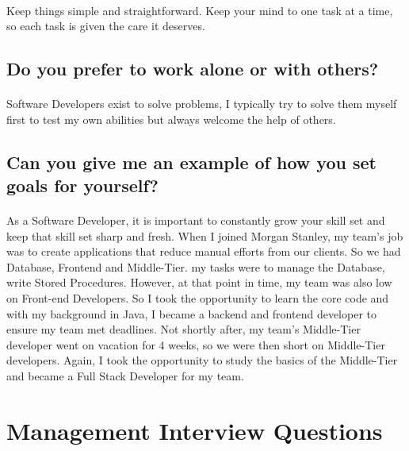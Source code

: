 \documentclass{article}
\begin{document}
\paragraph{}

	Keep things simple and straightforward. Keep your mind to one task at a time, so each task is given the care it deserves. 


\subsection{Do you prefer to work alone or with others?}

\paragraph{}

Software Developers exist to solve problems, I typically try to solve them myself first to test my own abilities but always welcome the help of others.  

\subsection{Can you give me an example of how you set goals for yourself?}

\paragraph{}

	As a Software Developer, it is important to constantly grow your skill set and keep that skill set sharp and fresh. When I joined Morgan Stanley, my team's job was to create applications that reduce manual efforts from our clients. So we had Database, Frontend and Middle-Tier. my tasks were to manage the Database, write Stored Procedures. However, at that point in time, my team was also low on Front-end Developers. So I took the opportunity to learn the core code and with my background in Java, I became a backend and frontend developer to ensure my team met deadlines. Not shortly after, my team's Middle-Tier developer went on vacation for 4 weeks, so we were then short on Middle-Tier developers. Again, I took the opportunity to study the basics of the Middle-Tier and became a Full Stack Developer for my team. 

\section{Management Interview Questions}
\end{document}
